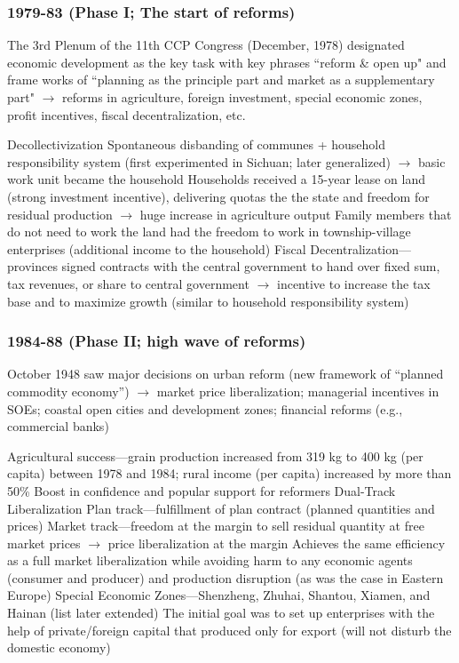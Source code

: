 \documentclass[11pt]{article}
\theoremstyle{definition}
\theoremstyle{remark}
\begin{document}
\subsubsection{1979-83 (Phase I; The start of reforms)} The 3rd Plenum of the 11th CCP Congress (December, 1978) designated economic development as the key task with key phrases ``reform \& open up" and frame works of ``planning as the principle part and market as a supplementary part" $\to$ reforms in agriculture, foreign investment, special economic zones, profit incentives, fiscal decentralization, etc.
\begin{outline}[enumerate]
\1 Decollectivization
	\2 Spontaneous disbanding of communes + household responsibility system (first experimented in Sichuan; later generalized) $\to$ basic work unit became the household
	\2 Households received a 15-year lease on land (strong investment incentive), delivering quotas the the state and freedom for residual production $\to$ huge increase in agriculture output
	\2 Family members that do not need to work the land had the freedom to work in township-village enterprises (additional income to the household)
\1 Fiscal Decentralization---provinces signed contracts with the central government to hand over fixed sum, tax revenues, or share to central government $\to$ incentive to increase the tax base and to maximize growth (similar to household responsibility system)
\end{outline}

\subsubsection{1984-88 (Phase II; high wave of reforms)} October 1948 saw major decisions on urban reform (new framework of ``planned commodity economy'') $\to$ market price liberalization; managerial incentives in SOEs; coastal open cities and development zones; financial reforms (e.g., commercial banks)
\begin{outline}[enumerate]
\1 Agricultural success---grain production increased from 319 kg to 400 kg (per capita) between 1978 and 1984; rural income (per capita) increased by more than 50\%
	\2 Boost in confidence and popular support for reformers
\1 Dual-Track Liberalization
	\2 Plan track---fulfillment of plan contract (planned quantities and prices)
	\2 Market track---freedom at the margin to sell residual quantity at free market prices $\to$ price liberalization at the margin
	\2 Achieves the same efficiency as a full market liberalization while avoiding harm to any economic agents (consumer and producer) and production disruption (as was the case in Eastern Europe)
\1 Special Economic Zones---Shenzheng, Zhuhai, Shantou, Xiamen, and Hainan (list later extended)
	\2 The initial goal was to set up enterprises with the help of private/foreign capital that produced only for export (will not disturb the domestic economy)
\end{outline}
\end{document}
